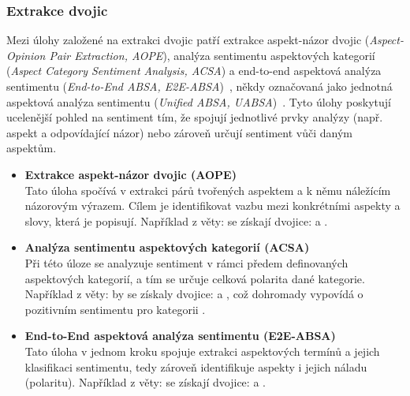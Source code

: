 \subsubsection{Extrakce dvojic}
Mezi úlohy založené na extrakci dvojic patří extrakce aspekt-názor dvojic (\emph{Aspect-Opinion Pair Extraction, AOPE}), analýza sentimentu aspektových kategorií (\emph{Aspect Category Sentiment Analysis, ACSA}) a end-to-end aspektová analýza sentimentu (\emph{End-to-End ABSA, E2E-ABSA})~\cite{MAO2024102048}, někdy označovaná jako jednotná aspektová analýza sentimentu (\emph{Unified ABSA, UABSA})~\cite{zhang-etal-2021-towards-generative}. Tyto úlohy poskytují ucelenější pohled na sentiment tím, že spojují jednotlivé prvky analýzy (např. aspekt a odpovídající názor) nebo zároveň určují sentiment vůči daným aspektům.

\begin{itemize}
    \item \textbf{Extrakce aspekt-názor dvojic (AOPE)} \\
    Tato úloha spočívá v extrakci párů tvořených aspektem a k němu náležícím názorovým výrazem. Cílem je identifikovat vazbu mezi konkrétními aspekty a slovy, která je popisují. Například z věty:  se získají dvojice:  a .~\cite{zhang-etal-2021-towards-generative}

    \item \textbf{Analýza sentimentu aspektových kategorií (ACSA)} \\
    Při této úloze se analyzuje sentiment v rámci předem definovaných aspektových kategorií, a tím se určuje celková polarita dané kategorie. Například z věty:  by se získaly dvojice:  a , což dohromady vypovídá o pozitivním sentimentu pro kategorii .~\cite{li2020multiinstancemultilabellearningnetworks}

    \item \textbf{End-to-End aspektová analýza sentimentu (E2E-ABSA)} \\
    Tato úloha v jednom kroku spojuje extrakci aspektových termínů a jejich klasifikaci sentimentu, tedy zároveň identifikuje aspekty i jejich náladu (polaritu). Například z věty:  se získají dvojice:  a .~\cite{zhang-etal-2021-towards-generative}
\end{itemize}

